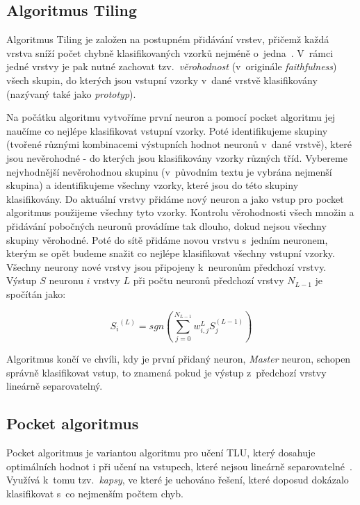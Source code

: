 \documentclass[a4paper, 11pt]{article}
\begin{document}
\subsection*{Algoritmus Tiling}
Algoritmus Tiling je založen na postupném přidávání vrstev, přičemž každá vrstva sníží počet chybně klasifikovaných vzorků nejméně o~jedna~\cite{mezard}. V~rám\-ci jedné vrstvy je pak nutné zachovat tzv.\ \emph{věrohodnost} (v~originále \emph{faithfulness}) všech skupin, do kterých jsou vstupní vzorky v~dané vrstvě klasifikovány (nazývaný také jako \emph{prototyp}).

Na počátku algoritmu vytvoříme první neuron a pomocí pocket algoritmu jej naučíme co nejlépe klasifikovat vstupní vzorky. Poté identifikujeme skupiny (tvořené různými kombinacemi výstupních hodnot neuronů v~dané vrstvě), které jsou nevěrohodné - do kterých jsou klasifikovány vzorky různých tříd. Vybereme nejvhodnější nevěrohodnou skupinu (v~původním textu je vybrána nejmenší skupina) a identifikujeme všechny vzorky, které jsou do této skupiny klasifikovány. Do aktuální vrstvy přidáme nový neuron a jako vstup pro pocket algoritmus použijeme všechny tyto vzorky. Kontrolu vě\-ro\-hod\-nos\-ti všech množin a přidávání pobočných neuronů provádíme tak dlouho, dokud nejsou všechny skupiny věrohodné. Poté do sítě přidáme novou vrstvu s~jedním neuronem, kterým se opět budeme snažit co nejlépe klasifikovat všechny vstupní vzorky. Všechny neurony nové vrstvy jsou při\-po\-je\-ny k~neuronům předchozí vrstvy. Výstup $S$ neuronu $i$ vrstvy $L$ při počtu neuronů předchozí vrstvy $N_{L-1}$ je spočítán jako:

\begin{equation*}
  {S_i}^{(L)}=sgn\left(\sum_{j=0}^{N_{L-1}} w_{i,j}^{L}S_{j}^{(L-1)}\right)
\end{equation*}

Algoritmus končí ve chvíli, kdy je první přidaný neuron, \emph{Master} neuron, schopen správně klasifikovat vstup, to znamená pokud je výstup z~předchozí vrstvy lineárně separovatelný.

\subsection*{Pocket algoritmus}
Pocket algoritmus je variantou algoritmu pro učení TLU, který dosahuje optimálních hodnot i při učení na vstupech, které nejsou lineárně separovatelné~\cite{ranka}. Využívá k~tomu tzv.\ \emph{kapsy}, ve které je uchováno řešení, které doposud dokázalo klasifikovat s~co nejmenším počtem chyb.
\end{document}

